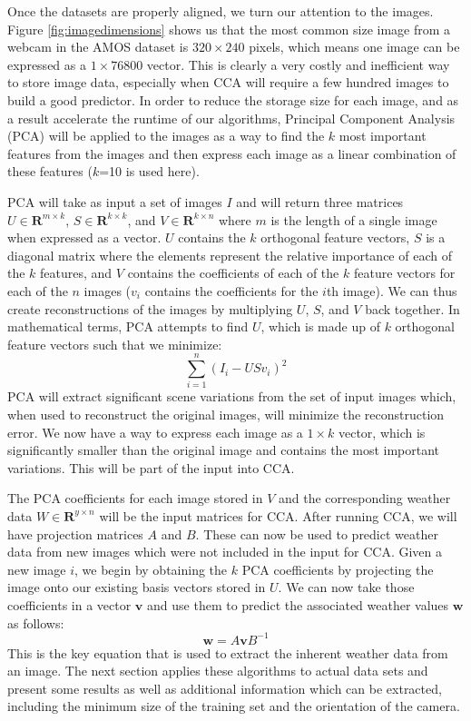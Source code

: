 Once the datasets are properly aligned, we turn our attention to the images. Figure \ref{fig:imagedimensions} shows us that the most common size image from a webcam in the AMOS dataset is $320\times 240$ pixels, which means one image can be expressed as a $1\times 76800$ vector. This is clearly a very costly and inefficient way to store image data, especially when CCA will require a few hundred images to build a good predictor. In order to reduce the storage size for each image, and as a result accelerate the runtime of our algorithms, Principal Component Analysis (PCA) will be applied to the images as a way to find the $k$ most important features from the images and then express each image as a linear combination of these features ($k$=10 is used here). 

PCA will take as input a set of images $I$ and will return three matrices $U\in \mathbf{R}^{m\times k}$, $S\in \mathbf{R}^{k\times k}$, and $V\in \mathbf{R}^{k\times n}$ where $m$ is the length of a single image when expressed as a vector. $U$ contains the $k$ orthogonal feature vectors, $S$ is a diagonal matrix where the elements represent the relative importance of each of the $k$ features, and $V$ contains the coefficients of each of the $k$ feature vectors for each of the $n$ images ($v_i$ contains the coefficients for the $i$th image). We can thus create reconstructions of the images by multiplying $U$, $S$, and $V$ back together. In mathematical terms, PCA attempts to find $U$, which is made up of $k$ orthogonal feature vectors such that we minimize:
\begin{equation}\sum_{i=1}^{n}{\left(I_i - USv_i\right)^2}\label{eq:pca}\end{equation}
PCA will extract significant scene variations from the set of input images which, when used to reconstruct the original images, will minimize the reconstruction error. We now have a way to express each image as a $1\times k$ vector, which is significantly smaller than the original image and contains the most important variations. This will be part of the input into CCA.

The PCA coefficients for each image stored in $V$ and the corresponding weather data $W \in \mathbf{R}^{y\times n}$ will be the input matrices for CCA. After running CCA, we will have projection matrices $A$ and $B$. These can now be used to predict weather data from new images which were not included in the input for CCA. Given a new image $i$, we begin by obtaining the $k$ PCA coefficients by projecting the image onto our existing basis vectors stored in $U$. We can now take those coefficients in a vector $\mathbf{v}$ and use them to predict the associated weather values $\mathbf{w}$ as follows:
\begin{equation}\label{eq:predict}\mathbf{w}=A\mathbf{v}B^{-1}\end{equation}
This is the key equation that is used to extract the inherent weather data from an image. The next section applies these algorithms to actual data sets and present some results as well as additional information which can be extracted, including the minimum size of the training set and the orientation of the camera.

